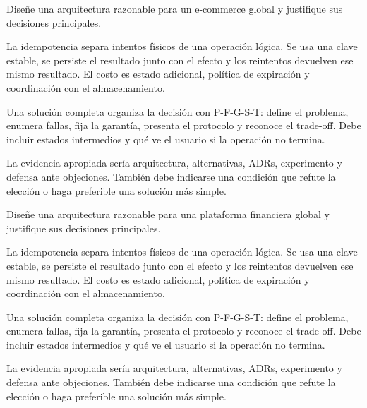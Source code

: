 \documentclass[variant=guia,cover=institutional,mode=screen]{ua-engineering-v6-article}
\begin{document}
\begin{uaexercise}
Diseñe una arquitectura razonable para un e-commerce global y justifique sus decisiones principales.
\end{uaexercise}
\begin{uaanswer}
La idempotencia separa intentos físicos de una operación lógica. Se usa una clave estable, se persiste el resultado junto con el efecto y los reintentos devuelven ese mismo resultado. El costo es estado adicional, política de expiración y coordinación con el almacenamiento.

Una solución completa organiza la decisión con P-F-G-S-T: define el problema, enumera fallas, fija la garantía, presenta el protocolo y reconoce el trade-off. Debe incluir estados intermedios y qué ve el usuario si la operación no termina.

La evidencia apropiada sería arquitectura, alternativas, ADRs, experimento y defensa ante objeciones. También debe indicarse una condición que refute la elección o haga preferible una solución más simple.
\end{uaanswer}

\begin{uaexercise}
Diseñe una arquitectura razonable para una plataforma financiera global y justifique sus decisiones principales.
\end{uaexercise}
\begin{uaanswer}
La idempotencia separa intentos físicos de una operación lógica. Se usa una clave estable, se persiste el resultado junto con el efecto y los reintentos devuelven ese mismo resultado. El costo es estado adicional, política de expiración y coordinación con el almacenamiento.

Una solución completa organiza la decisión con P-F-G-S-T: define el problema, enumera fallas, fija la garantía, presenta el protocolo y reconoce el trade-off. Debe incluir estados intermedios y qué ve el usuario si la operación no termina.

La evidencia apropiada sería arquitectura, alternativas, ADRs, experimento y defensa ante objeciones. También debe indicarse una condición que refute la elección o haga preferible una solución más simple.
\end{uaanswer}
\end{document}
